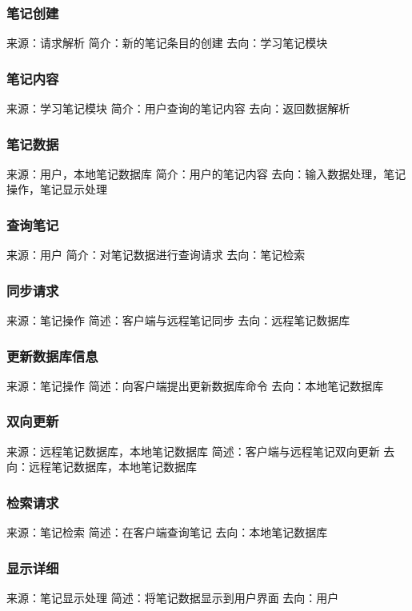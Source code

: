 \subsubsection{笔记创建}
来源：请求解析
简介：新的笔记条目的创建
去向：学习笔记模块

\subsubsection{笔记内容}
来源：学习笔记模块
简介：用户查询的笔记内容
去向：返回数据解析




\subsubsection{笔记数据}
来源：用户，本地笔记数据库
简介：用户的笔记内容
去向：输入数据处理，笔记操作，笔记显示处理

\subsubsection{查询笔记}
来源：用户
简介：对笔记数据进行查询请求
去向：笔记检索

\subsubsection{同步请求}
来源：笔记操作
简述：客户端与远程笔记同步
去向：远程笔记数据库

\subsubsection{更新数据库信息}
来源：笔记操作
简述：向客户端提出更新数据库命令
去向：本地笔记数据库

\subsubsection{双向更新}
来源：远程笔记数据库，本地笔记数据库
简述：客户端与远程笔记双向更新
去向：远程笔记数据库，本地笔记数据库

\subsubsection{检索请求}
来源：笔记检索
简述：在客户端查询笔记
去向：本地笔记数据库

\subsubsection{显示详细}
来源：笔记显示处理
简述：将笔记数据显示到用户界面
去向：用户


